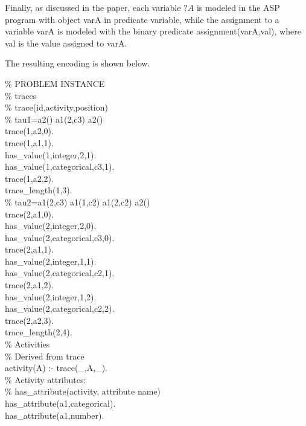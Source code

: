 Finally, as discussed in the paper, each variable $?A$ is 
modeled in the ASP program with object {\asp varA} in predicate
{\asp variable}, while the assignment to a variable {\asp varA} is 
modeled with the binary predicate {\asp assignment(varA,val)}, where 
{\asp val} is the value assigned to {\asp varA}.

The resulting encoding is shown below.\\

\begin{small}
\begin{aspcode}
\noindent
\% PROBLEM INSTANCE\\

\noindent
\% traces\\
\% trace(id,activity,position)\\

\noindent
\% tau1=a2() a1(2,c3) a2()\\
trace(1,a2,0).\\
trace(1,a1,1).\\
has\_value(1,integer,2,1).\\
has\_value(1,categorical,c3,1).\\
trace(1,a2,2).\\
trace\_length(1,3).\\

\noindent
\% tau2=a1(2,c3) a1(1,c2) a1(2,c2) a2()\\
trace(2,a1,0).\\
has\_value(2,integer,2,0).\\
has\_value(2,categorical,c3,0).\\
trace(2,a1,1).\\
has\_value(2,integer,1,1).\\
has\_value(2,categorical,c2,1).\\
trace(2,a1,2).\\
has\_value(2,integer,1,2).\\
has\_value(2,categorical,c2,2).\\
trace(2,a2,3).\\
trace\_length(2,4).\\

\noindent\% Activities\\
\% Derived from trace\\
activity(A) :- trace(\_,A,\_).\\

\noindent
\% Activity attributes:\\
\% has\_attribute(activity, attribute name)\\
has\_attribute(a1,categorical).\\
has\_attribute(a1,number).\\


\end{aspcode}
\end{small}
